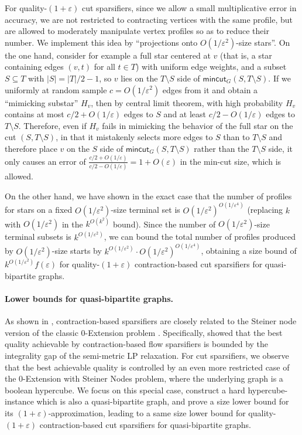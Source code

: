 \documentclass[11pt]{article}
\theoremstyle{definition}
\newcommand{\eps}{{\varepsilon}}
\newcommand{\mc}{\mathsf{mincut}}
\begin{document}
For quality-$(1+\eps)$ cut sparsifiers, since we allow a small multiplicative error in accuracy, we are not restricted to contracting vertices with the same profile, but are allowed to moderately manipulate vertex profiles so as to reduce their number. We implement this idea by ``projections onto $O(1/\eps^2)$-size stars''. On the one hand, consider for example a full star centered at $v$ (that is, a star containing edges $(v,t)$ for all $t\in T$) with uniform edge weights, and a subset $S\subseteq T$ with $|S|=|T|/2-1$, so $v$ lies on the $T\setminus S$ side of $\mc_G(S,T\setminus S)$. If we uniformly at random sample $c=O(1/\eps^2)$ edges from it and obtain a ``mimicking substar'' $H_v$, then by central limit theorem, with high probability $H_v$ contains at most $c/2+O(1/\eps)$ edges to $S$ and at least $c/2-O(1/\eps)$ edges to $T\setminus S$. Therefore, even if $H_v$ fails in mimicking the behavior of the full star on the cut $(S,T\setminus S)$, in that it mistakenly selects more edges to $S$ than to $T\setminus S$ and therefore place $v$ on the $S$ side of $\mc_G(S,T\setminus S)$ rather than the $T\setminus S$ side, it only causes an error of $\frac{c/2+O(1/\eps)}{c/2-O(1/\eps)}=1+O(\eps)$ in the min-cut size, which is allowed.

On the other hand, we have shown in the exact case that the number of profiles for stars on a fixed $O(1/\eps^2)$-size terminal set is $O(1/\eps^2)^{O(1/\eps^4)}$ (replacing $k$ with $O(1/\eps^2)$ in the $k^{O(k^2)}$ bound). Since the number of $O(1/\eps^2)$-size terminal subsets is $k^{O(1/\eps^2)}$, we can bound the total number of profiles produced by $O(1/\eps^2)$-size starts by 
 $k^{O(1/\eps^2)}\cdot O(1/\eps^2)^{O(1/\eps^4)}$, obtaining a size bound of $k^{O(1/\eps^2)} f(\eps)$ for quality-$(1+\eps)$ contraction-based cut sparsifiers for quasi-bipartite graphs.



\paragraph{Lower bounds for quasi-bipartite graphs.}
As shown in \cite{chen20241+,chen2024lower}, contraction-based sparsifiers are closely related to the Steiner node version of the classic $0$-Extension problem \cite{karzanov1998minimum}. Specifically, \cite{chen20241+} showed that the best quality achievable by contraction-based flow sparsifiers is bounded by the integrality gap of the semi-metric LP relaxation. For cut sparsifiers, we observe that the best achievable quality is controlled by an even more restricted case of the $0$-Extension with Steiner Nodes problem, where the underlying graph is a boolean hypercube. We focus on this special case, construct a hard hypercube-instance which is also a quasi-bipartite graph, and prove a size lower bound for its $(1+\eps)$-approximation, leading to a same size lower bound for quality-$(1+\eps)$ contraction-based cut sparsifiers for quasi-bipartite graphs.
\end{document}

